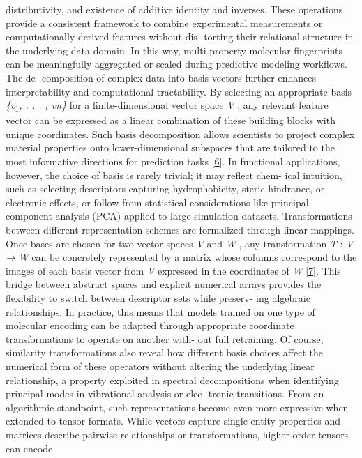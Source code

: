 \documentclass[
]{article}
\begin{document}
distributivity, and existence of additive identity and inverses. These
operations provide a consistent framework to combine experimental
measurements or computationally derived features without dis- torting
their relational structure in the underlying data domain. In this way,
multi-property molecular fingerprints can be meaningfully aggregated or
scaled during predictive modeling workflows. The de- composition of
complex data into basis vectors further enhances interpretability and
computational tractability. By selecting an appropriate basis
\emph{\{v}\textsubscript{1}\emph{, . . . , vn\}} for a
finite-dimensional vector space \emph{V} , any relevant feature vector
can be expressed as a linear combination of these building blocks with
unique coordinates. Such basis decomposition allows scientists to
project complex material properties onto lower-dimensional subspaces
that are tailored to the most informative directions for prediction
tasks {[}\protect\hyperlink{_bookmark46}{6}{]}. In functional
applications, however, the choice of basis is rarely trivial; it may
reflect chem- ical intuition, such as selecting descriptors capturing
hydrophobicity, steric hindrance, or electronic effects, or follow from
statistical considerations like principal component analysis (PCA)
applied to large simulation datasets. Transformations between different
representation schemes are formalized through linear mappings. Once
bases are chosen for two vector spaces \emph{V} and \emph{W} , any
transformation \emph{T} : \emph{V → W} can be concretely represented by
a matrix whose columns correspond to the images of each basis vector
from \emph{V} expressed in the coordinates of \emph{W}
{[}\protect\hyperlink{_bookmark47}{7}{]}. This bridge between abstract
spaces and explicit numerical arrays provides the flexibility to switch
between descriptor sets while preserv- ing algebraic relationships. In
practice, this means that models trained on one type of molecular
encoding can be adapted through appropriate coordinate transformations
to operate on another with- out full retraining. Of course, similarity
transformations also reveal how different basis choices affect the
numerical form of these operators without altering the underlying linear
relationship, a property exploited in spectral decompositions when
identifying principal modes in vibrational analysis or elec- tronic
transitions. From an algorithmic standpoint, such representations become
even more expressive when extended to tensor formats. While vectors
capture single-entity properties and matrices describe pairwise
relationships or transformations, higher-order tensors can encode
\end{document}
